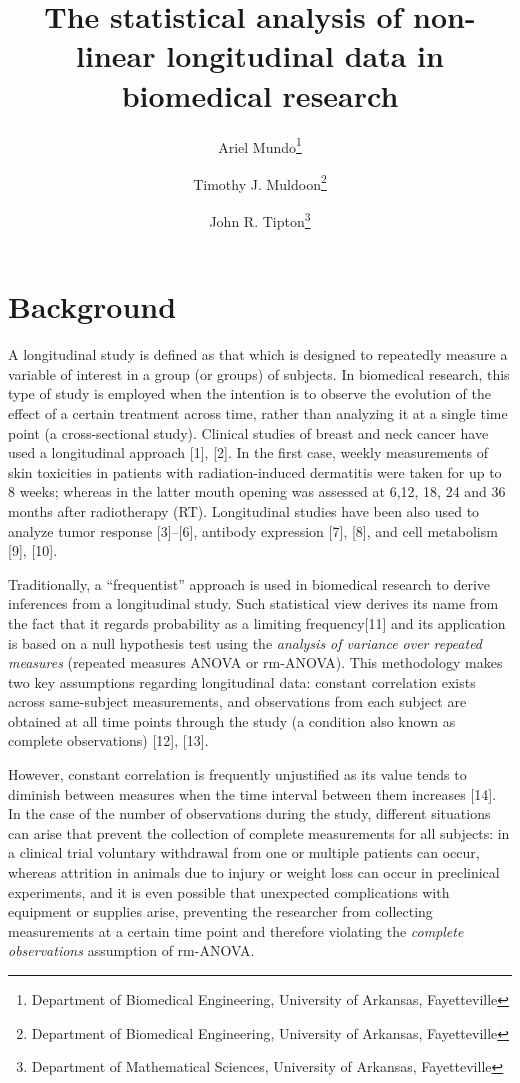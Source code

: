 \documentclass[
]{article}
\title{\textbf{The statistical analysis of non-linear longitudinal data in biomedical research}}
\author{Ariel Mundo\footnote{Department of Biomedical Engineering, University of Arkansas, Fayetteville} \and Timothy J. Muldoon\footnote{Department of Biomedical Engineering, University of Arkansas, Fayetteville} \and John R. Tipton\footnote{Department of Mathematical Sciences, University of Arkansas, Fayetteville}}
\date{}
\begin{document}
\maketitle

{
\setcounter{tocdepth}{2}
\tableofcontents
}
\hypertarget{background}{%
\section{Background}\label{background}}

A longitudinal study is defined as that which is designed to repeatedly measure a variable of interest in a group (or groups) of subjects. In biomedical research, this type of study is employed when the intention is to observe the evolution of the effect of a certain treatment across time, rather than analyzing it at a single time point (a cross-sectional study). Clinical studies of breast and neck cancer have used a longitudinal approach {[}1{]}, {[}2{]}. In the first case, weekly measurements of skin toxicities in patients with radiation-induced dermatitis were taken for up to 8 weeks; whereas in the latter mouth opening was assessed at 6,12, 18, 24 and 36 months after radiotherapy (RT). Longitudinal studies have been also used to analyze tumor response {[}3{]}--{[}6{]}, antibody expression {[}7{]}, {[}8{]}, and cell metabolism {[}9{]}, {[}10{]}.

Traditionally, a ``frequentist'' approach is used in biomedical research to derive inferences from a longitudinal study. Such statistical view derives its name from the fact that it regards probability as a limiting frequency{[}11{]} and its application is based on a null hypothesis test using the \emph{analysis of variance over repeated measures} (repeated measures ANOVA or rm-ANOVA). This methodology makes two key assumptions regarding longitudinal data: constant correlation exists across same-subject measurements, and observations from each subject are obtained at all time points through the study (a condition also known as complete observations) {[}12{]}, {[}13{]}.

However, constant correlation is frequently unjustified as its value tends to diminish between measures when the time interval between them increases {[}14{]}.
In the case of the number of observations during the study, different situations can arise that prevent the collection of complete measurements for all subjects: in a clinical trial voluntary withdrawal from one or multiple patients can occur, whereas attrition in animals due to injury or weight loss can occur in preclinical experiments, and it is even possible that unexpected complications with equipment or supplies arise, preventing the researcher from collecting measurements at a certain time point and therefore violating the \emph{complete observations} assumption of rm-ANOVA.
\end{document}

